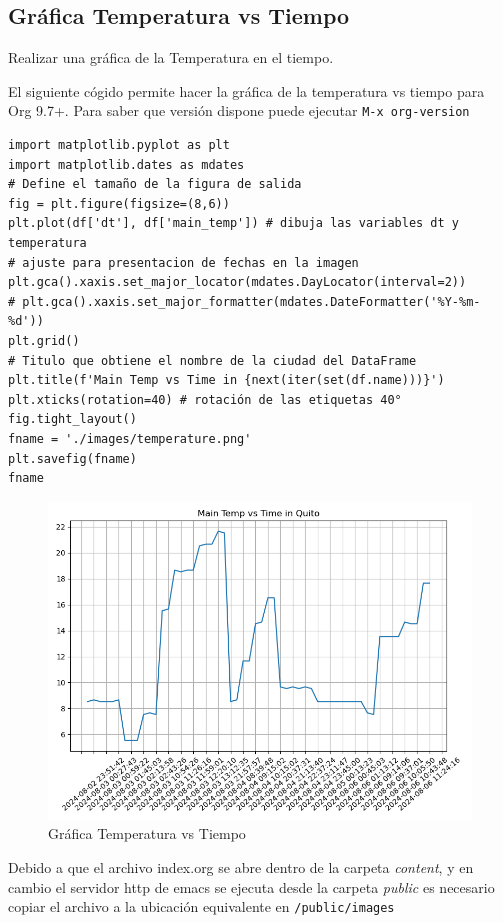 \documentclass{article}
\begin{document}
\subsection{Gráfica Temperatura vs Tiempo}
\label{sec:orgda557fe}
Realizar una gráfica de la Temperatura en el tiempo.


El siguiente cógido permite hacer la gráfica de la temperatura vs
tiempo para Org 9.7+. Para saber que versión dispone puede ejecutar
\texttt{M-x org-version}

\begin{verbatim}
import matplotlib.pyplot as plt
import matplotlib.dates as mdates
# Define el tamaño de la figura de salida
fig = plt.figure(figsize=(8,6))
plt.plot(df['dt'], df['main_temp']) # dibuja las variables dt y temperatura
# ajuste para presentacion de fechas en la imagen 
plt.gca().xaxis.set_major_locator(mdates.DayLocator(interval=2))
# plt.gca().xaxis.set_major_formatter(mdates.DateFormatter('%Y-%m-%d'))  
plt.grid()
# Titulo que obtiene el nombre de la ciudad del DataFrame
plt.title(f'Main Temp vs Time in {next(iter(set(df.name)))}')
plt.xticks(rotation=40) # rotación de las etiquetas 40°
fig.tight_layout()
fname = './images/temperature.png'
plt.savefig(fname)
fname
\end{verbatim}

\begin{figure}[htbp]
\centering
\includegraphics[width=.9\linewidth]{../images/temperature.png}
\caption{Gráfica Temperatura vs Tiempo}
\end{figure}

Debido a que el archivo index.org se abre dentro de la carpeta
\emph{content}, y en cambio el servidor http de emacs se ejecuta desde la
carpeta \emph{public} es necesario copiar el archivo a la ubicación
equivalente en \texttt{/public/images}
\end{document}
